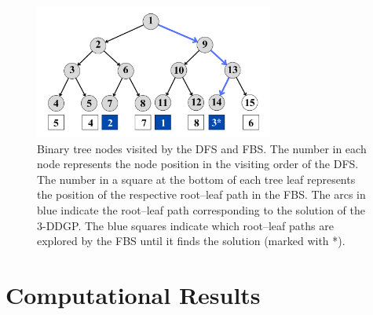 \documentclass[journal=jacsat,manuscript=article]{achemso}
\begin{document}
\begin{figure}[H]
	    \includegraphics[width=0.7\textwidth]{Figures/nos_visitados_dfs_e_fbs.pdf}
    \caption{\normalsize Binary tree nodes visited by the DFS and FBS. The number in each node represents the node position in the visiting order of the DFS. The number in a square at the bottom of each tree leaf represents the position of the respective root--leaf path in the FBS. The arcs in blue indicate the root--leaf path corresponding to the solution of the 3-DDGP. The blue squares indicate which root--leaf paths are explored by the FBS until it finds the solution (marked with *).}\label{fig:nos_visitados_dfs_e_fbs}
\end{figure}

\section{Computational Results}
\end{document}
